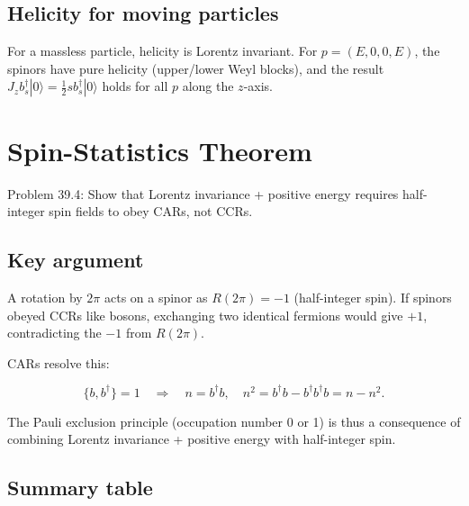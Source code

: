 
\subsection{Helicity for moving particles}

For a massless particle, helicity is Lorentz invariant.
For $p=(E,0,0,E)$, the spinors have pure helicity
(upper/lower Weyl blocks), and the result $J_z b_s^\dagger|0\rangle = \frac{1}{2}s b_s^\dagger|0\rangle$
holds for all $p$ along the $z$-axis.


\section{Spin-Statistics Theorem}

Problem 39.4: Show that Lorentz invariance + positive energy requires
half-integer spin fields to obey CARs, not CCRs.

\subsection{Key argument}

A rotation by $2\pi$ acts on a spinor as $R(2\pi)=-1$ (half-integer spin).
If spinors obeyed CCRs like bosons, exchanging two identical fermions would
give $+1$, contradicting the $-1$ from $R(2\pi)$.

CARs resolve this:
\begin{mdframed}[backgroundcolor=green!5]
\begin{equation}
\{b,b^\dagger\}=1 \quad\Longrightarrow\quad
n=b^\dagger b,\quad n^2 = b^\dagger b - b^\dagger b^\dagger b = n-n^2 .
\end{equation}
\end{mdframed}

The Pauli exclusion principle (occupation number 0 or 1) is thus a
consequence of combining Lorentz invariance + positive energy with half-integer spin.

\subsection{Summary table}

